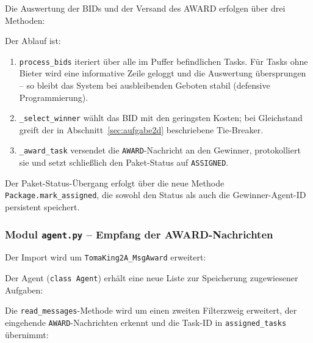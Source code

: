 Die Auswertung der BIDs und der Versand des AWARD erfolgen über drei Methoden:



Der Ablauf ist:
\begin{enumerate}
    \item \texttt{process\_bids} iteriert über alle im Puffer befindlichen Tasks. Für Tasks ohne Bieter wird eine informative Zeile geloggt und die Auswertung übersprungen -- so bleibt das System bei ausbleibenden Geboten stabil (defensive Programmierung).
    \item \texttt{\_select\_winner} wählt das BID mit den geringsten Kosten; bei Gleichstand greift der in Abschnitt~\ref{sec:aufgabe2d} beschriebene Tie-Breaker.
    \item \texttt{\_award\_task} versendet die \texttt{AWARD}-Nachricht an den Gewinner, protokolliert sie und setzt schließlich den Paket-Status auf \texttt{ASSIGNED}.
\end{enumerate}

Der Paket-Status-Übergang erfolgt über die neue Methode \texttt{Package.mark\_assigned}, die sowohl den Status als auch die Gewinner-Agent-ID persistent speichert.


\subsubsection{Modul \texttt{agent.py} – Empfang der AWARD-Nachrichten}

Der Import wird um \texttt{TomaKing2A\_MsgAward} erweitert:



Der Agent (\texttt{class Agent}) erhält eine neue Liste zur Speicherung zugewiesener Aufgaben:



Die \texttt{read\_messages}-Methode wird um einen zweiten Filterzweig erweitert, der eingehende \texttt{AWARD}-Nachrichten erkennt und die Task-ID in \texttt{assigned\_tasks} übernimmt:

